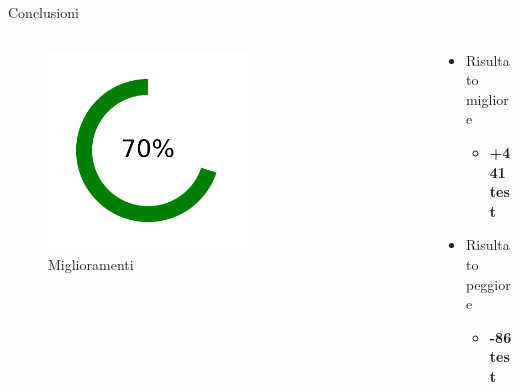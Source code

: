 \documentclass{beamer}
\begin{document}
\begin{frame}{Conclusioni}
    \begin{columns}[T]
        \begin{column}{0.5\textwidth}
            \vspace{-10mm}
            \begin{figure}[h]
                \includegraphics[width=0.6\textwidth]{img/donut-chart.pdf}\\
                Miglioramenti
            \end{figure}
        \end{column}
        \begin{column}{0.5\textwidth}
                \begin{center}
                \vspace{-5mm}
                \begin{itemize}
                    \item Risultato migliore
                    \begin{itemize}
                        \item \textbf{\color{darkgreen}+441 test}
                    \end{itemize}
                    \item Risultato peggiore
                    \begin{itemize}
                        \item \textbf{\color{red}-86 test}
                    \end{itemize}
                \end{itemize}
                \end{center}
        \end{column}
    \end{columns}

\end{frame}
\end{document}
